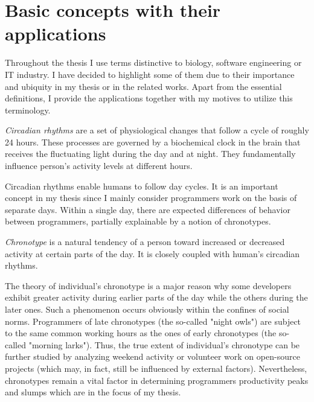 \section{Basic concepts with their applications}

Throughout the thesis I use terms distinctive to biology, software engineering or IT industry. I have decided to highlight some of them due to their importance and ubiquity in my thesis or in the related works. Apart from the essential definitions, I provide the applications together with my motives to utilize this terminology.

\begin{definition}\label{def:circadian_rhythm}
\emph{Circadian rhythms} are a set of physiological changes that follow a cycle of roughly 24 hours. These processes are governed by a biochemical clock in the brain that receives the fluctuating light during the day and at night. They fundamentally influence person's activity levels at different hours. \cite{Rep02CircadianTiming}
\end{definition}

Circadian rhythms enable humans to follow day cycles. It is an important concept in my thesis since I mainly consider programmers work on the basis of separate days. Within a single day, there are expected differences of behavior between programmers, partially explainable by a notion of chronotypes.

\begin{definition}
\emph{Chronotype} is a natural tendency of a person toward increased or decreased activity at certain parts of the day. It is closely coupled with human's circadian rhythms. \cite{Roe03Chronotypes}
\end{definition}

The theory of individual's chronotype is a major reason why some developers exhibit greater activity during earlier parts of the day while the others during the later ones. Such a phenomenon occurs obviously within the confines of social norms. Programmers of late chronotypes (the so-called "night owls") are subject to the same common working hours as the ones of early chronotypes (the so-called "morning larks"). Thus, the true extent of individual's chronotype can be further studied by analyzing weekend activity or volunteer work on open-source projects (which may, in fact, still be influenced by external factors). Nevertheless, chronotypes remain a vital factor in determining programmers productivity peaks and slumps which are in the focus of my thesis.

